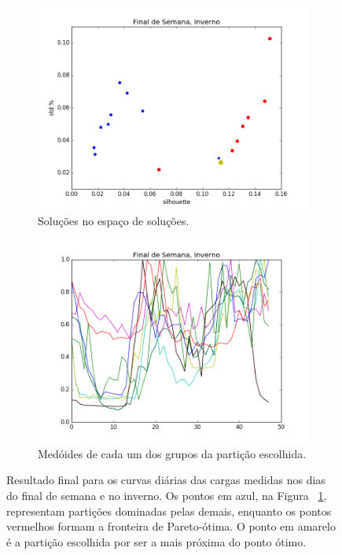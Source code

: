 \begin{figure}
	\centering
	\begin{subfigure}{.5\textwidth}
		\centering
		\includegraphics[width=.9\linewidth]{figuras/australia_5000/pareto_Final_de_Semana_Inverno.png}
		\caption{Soluções no espaço de soluções.}
		\label{fig:pareto_FDS_inverno}
	\end{subfigure}%
	\begin{subfigure}{.5\textwidth}
		\centering
		\includegraphics[width=.9\linewidth]{figuras/australia_5000/Final_de_Semana_Inverno.png}
		\caption{Medóides de cada um dos grupos da partição escolhida.}
		\label{fig:FDS_inverno}
	\end{subfigure}
	\caption{Resultado final para os curvas diárias das cargas medidas nos dias do final de semana e no inverno. Os pontos em azul, na Figura ~\ref{fig:pareto_FDS_inverno}, representam partições dominadas pelas demais, enquanto os pontos vermelhos formam a fronteira de Pareto-ótima. O ponto em amarelo é a partição escolhida por ser a mais próxima do ponto ótimo.}
	\label{fig:FDS_inverno_}
\end{figure}

